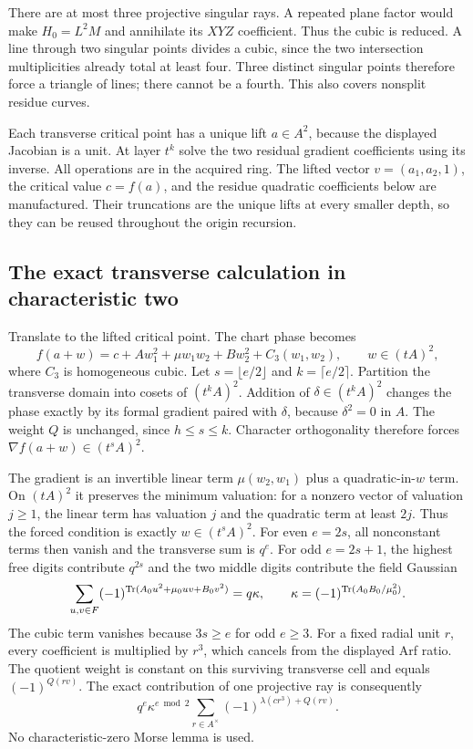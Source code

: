 There are at most three projective singular rays. A repeated plane factor
would make $H_0=L^2M$ and annihilate its $XYZ$ coefficient. Thus the
cubic is reduced. A line through two singular points divides a cubic,
since the two intersection multiplicities already total at least four.
Three distinct singular points therefore force a triangle of lines;
there cannot be a fourth. This also covers nonsplit residue curves.

Each transverse critical point has a unique lift $a\in A^2$, because
the displayed Jacobian is a unit. At layer $t^k$ solve the two residual
gradient coefficients using its inverse. All operations are in the
acquired ring. The lifted vector $v=(a_1,a_2,1)$, the critical value
$c=f(a)$, and the residue quadratic coefficients below are manufactured.
Their truncations are the unique lifts at every smaller depth, so they
can be reused throughout the origin recursion.

\subsection{The exact transverse calculation in characteristic two}
Translate to the lifted critical point. The chart phase becomes
\[
 f(a+w)=c+A w_1^2+\mu w_1w_2+B w_2^2+C_3(w_1,w_2),
 \qquad w\in(tA)^2,
\]
where $C_3$ is homogeneous cubic. Let $s=\lfloor e/2\rfloor$ and
$k=\lceil e/2\rceil$. Partition the transverse domain into cosets of
$(t^kA)^2$. Addition of $\delta\in(t^kA)^2$ changes the phase exactly
by its formal gradient paired with $\delta$, because $\delta^2=0$ in
$A$. The weight $Q$ is unchanged, since $h\le s\le k$.
Character orthogonality therefore forces
$\nabla f(a+w)\in(t^sA)^2$.

The gradient is an invertible linear term $\mu(w_2,w_1)$ plus a
quadratic-in-$w$ term. On $(tA)^2$ it preserves the minimum valuation:
for a nonzero vector of valuation $j\ge1$, the linear term has
valuation $j$ and the quadratic term at least $2j$.
Thus the forced condition is exactly $w\in(t^sA)^2$.
For even $e=2s$, all nonconstant terms then vanish and the transverse
sum is $q^e$. For odd $e=2s+1$, the highest free digits contribute
$q^{2s}$ and the two middle digits contribute the field Gaussian
\[
 \sum_{u,v\in F}(-1)^{\operatorname{Tr}(A_0u^2+\mu_0uv+B_0v^2)}
   =q\kappa,\qquad
 \kappa=(-1)^{\operatorname{Tr}(A_0B_0/\mu_0^2)}.
\]
The cubic term vanishes because $3s\ge e$ for odd $e\ge3$.
For a fixed radial unit $r$, every coefficient is multiplied by $r^3$,
which cancels from the displayed Arf ratio. The quotient weight is
constant on this surviving transverse cell and equals $(-1)^{Q(rv)}$.
The exact contribution of one projective ray is consequently
\begin{equation}\label{eq:weightedray}
 q^e\kappa^{e\bmod2}
 \sum_{r\in A^\times}(-1)^{\lambda(c r^3)+Q(rv)}.
\end{equation}
No characteristic-zero Morse lemma is used.

